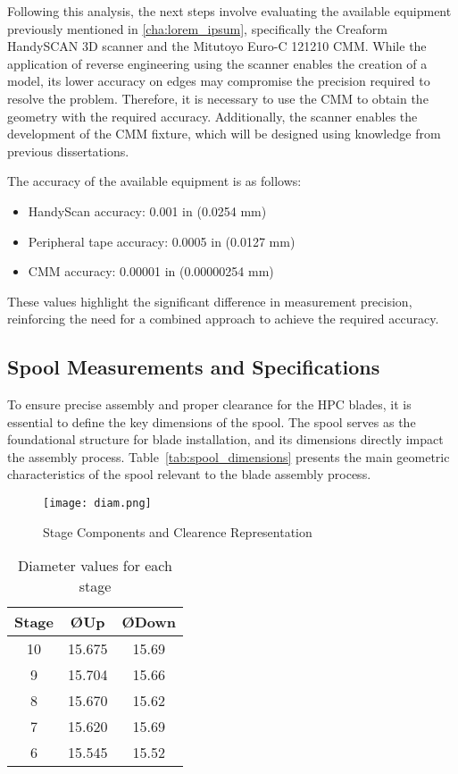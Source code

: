 Following this analysis, the next steps involve evaluating the available equipment previously mentioned in \ref{cha:lorem_ipsum}, specifically the Creaform HandySCAN 3D scanner and the Mitutoyo Euro-C 121210 \gls{CMM}. While the application of reverse engineering using the scanner enables the creation of a model, its lower accuracy on edges may compromise the precision required to resolve the problem. Therefore, it is necessary to use the CMM to obtain the geometry with the required accuracy. Additionally, the scanner enables the development of the CMM fixture, which will be designed using knowledge from previous dissertations.

The accuracy of the available equipment is as follows:  

\begin{itemize}
    \item HandyScan accuracy: 0.001 in (0.0254 mm)
    \item Peripheral tape accuracy: 0.0005 in (0.0127 mm)
    \item CMM accuracy: 0.00001 in (0.00000254 mm)
\end{itemize}

These values highlight the significant difference in measurement precision, reinforcing the need for a combined approach to achieve the required accuracy.

\subsection{Spool Measurements and Specifications}
\label{subsec:spool_measurements}

To ensure precise assembly and proper clearance for the HPC blades, it is essential to define the key dimensions of the spool. The spool serves as the foundational structure for blade installation, and its dimensions directly impact the assembly process. Table~\ref{tab:spool_dimensions} presents the main geometric characteristics of the spool relevant to the blade assembly process.


\begin{figure}[H]
    \centering
    \texttt{[image: diam.png]}
    \caption{Stage Components and Clearence Representation}
    \label{fig:diam.png}
\end{figure}

\begin{table}[h]
    \centering
    \begin{tabular}{|c|c|c|}
        \hline
        Stage & ØUp & ØDown \\
        \hline
        10 & 15.675 & 15.69 \\
        9  & 15.704 & 15.66 \\
        8  & 15.670 & 15.62 \\
        7  & 15.620 & 15.69 \\
        6  & 15.545 & 15.52 \\
        \hline
    \end{tabular}
    \caption{Diameter values for each stage}
    \label{tab:diameters}
\end{table}


